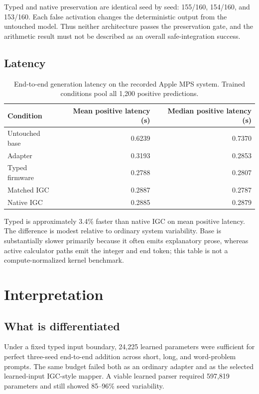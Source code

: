 \documentclass[11pt]{article}
\begin{document}
Typed and native preservation are identical seed by seed: 155/160, 154/160,
and 153/160. Each false activation changes the deterministic output from the
untouched model. Thus neither architecture passes the preservation gate, and
the arithmetic result must not be described as an overall safe-integration
success.

\subsection{Latency}

\begin{table}[H]
\centering
\small
\begin{tabular}{lrr}
\toprule
Condition & Mean positive latency (s) & Median positive latency (s)\\
\midrule
Untouched base & 0.6239 & 0.7370\\
Adapter & 0.3193 & 0.2853\\
Typed firmware & 0.2788 & 0.2807\\
Matched IGC & 0.2887 & 0.2787\\
Native IGC & 0.2885 & 0.2879\\
\bottomrule
\end{tabular}
\caption{End-to-end generation latency on the recorded Apple MPS system.
Trained conditions pool all 1,200 positive predictions.}
\label{tab:latency}
\end{table}

Typed is approximately 3.4\% faster than native IGC on mean positive latency.
The difference is modest relative to ordinary system variability. Base is
substantially slower primarily because it often emits explanatory prose,
whereas active calculator paths emit the integer and end token; this table is
not a compute-normalized kernel benchmark.

\section{Interpretation}

\subsection{What is differentiated}

Under a fixed typed input boundary, 24,225 learned parameters were sufficient
for perfect three-seed end-to-end addition across short, long, and word-problem
prompts. The same budget failed both as an ordinary adapter and as the selected
learned-input IGC-style mapper. A viable learned parser required 597,819
parameters and still showed 85--96\% seed variability.
\end{document}

